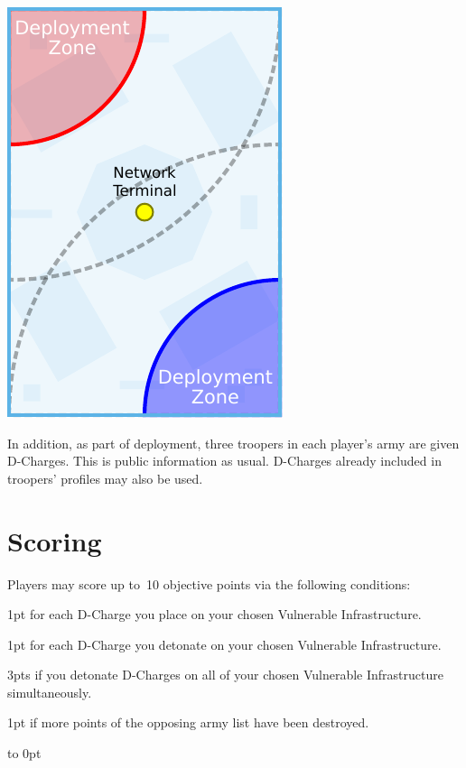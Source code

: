 \begin{minipage}[t]{2in}\centering
\vspace{4pt}   
\includegraphics{maps/map-plant}
\end{minipage}

In addition, as part of deployment, three troopers in each player's
army are given D-Charges.  This is public information as usual.
D-Charges already included in troopers' profiles may also be used.

\section{Scoring}

Players may score up to~10 objective points via the following
conditions:
\begin{squishitemize}
\item 1pt for each D-Charge you place on your chosen Vulnerable
  Infrastructure.
\item 1pt for each D-Charge you detonate on your chosen Vulnerable
  Infrastructure.
\item 3pts if you detonate D-Charges on all of your chosen Vulnerable
  Infrastructure simultaneously.

\item 1pt if more points of the opposing army list have been destroyed.
\end{squishitemize}

\vfill
\vbox to 0pt{}